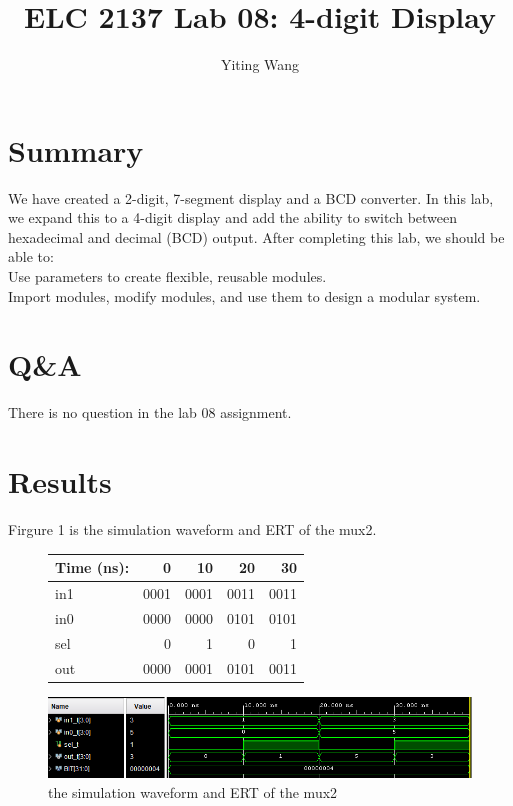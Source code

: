\documentclass[11pt]{article}
\begin{document}
\title{ELC 2137 Lab 08: 4-digit Display}
\author{Yiting Wang}

\maketitle


\section*{Summary}

We have created a 2-digit, 7-segment display and a BCD converter. In this lab, we expand this to a 4-digit display and add the ability to switch between hexadecimal and decimal (BCD) output. After completing this lab, we should be able to:\\
Use parameters to create flexible, reusable modules.\\
Import modules, modify modules, and use them to design a modular system.\\



\section*{Q\&A}

There is no question in the lab 08 assignment.\\



\section*{Results}

	Firgure 1 is the simulation waveform and ERT of the mux2.\\
    \begin{figure}[ht]\centering
        \begin{tabular}{l|rrrr}
            Time (ns): & 0 & 10 & 20 & 30 \\
            \midrule
            in1 & 0001 & 0001 & 0011 & 0011 \\
            in0 & 0000 & 0000 & 0101 & 0101 \\
            sel & 0 & 1 & 0 & 1 \\
            \midrule
            out & 0000 & 0001 & 0101 & 0011\\
            \bottomrule
        \end{tabular}\medskip

        \includegraphics[width=1\textwidth]{mux2_simulation}
        \caption{the simulation waveform and ERT of the mux2}
        \label{fig:mux2_simulation}
    \end{figure}
\end{document}
